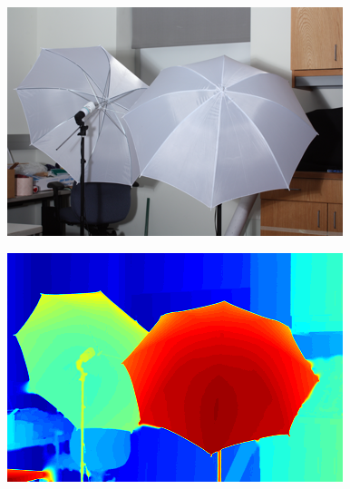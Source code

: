 \documentclass[a0,landscape]{a0poster}
\begin{document}
\begin{multicols}{4}
{ \centering
  \begin{minipage}{0.45\columnwidth}
    \centering
    \includegraphics[width=\textwidth]{./Images/Umbrella/optical.png}%
  \end{minipage}\hfill %
  \begin{minipage}{0.45\columnwidth}
    \centering
    \includegraphics[width=\textwidth]{./Images/Umbrella/lidarColor.png}
  \end{minipage}
  \label{fig:Umbrellafig1}
}


\end{multicols}
\end{document}
